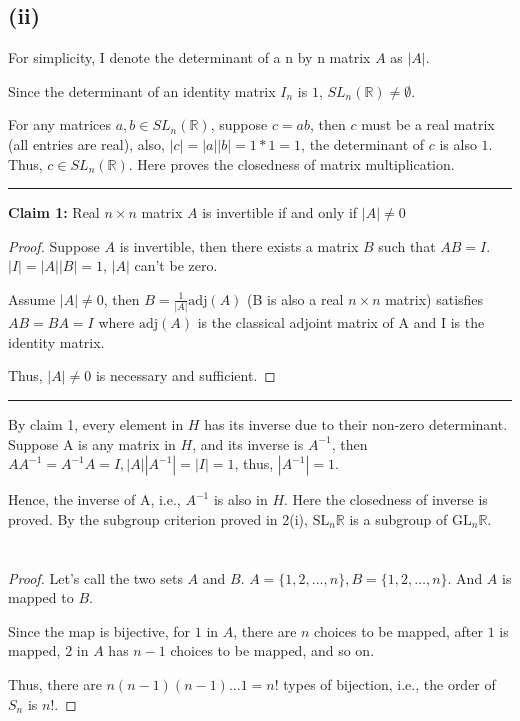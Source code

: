 \documentclass[12pt]{article}
\begin{document}
\subsection*{(ii)}
For simplicity, I denote the determinant of a n by n matrix $A$ as $|A|$.

Since the determinant of an identity matrix $I_n$ is $1$, $SL_n(\mathbb{R})\ne \emptyset$.

For any matrices $a,b\in SL_n(\mathbb{R})$, suppose $c=ab$, then $c$ must be a real matrix (all entries are real), also, $|c|=|a||b|=1*1=1$, the determinant of $c$ is also $1$. Thus, $c\in SL_n(\mathbb{R})$. Here proves the closedness of matrix multiplication.

\noindent\rule{\textwidth}{1pt}
\noindent \textbf{Claim 1: } Real $n\times n$ matrix $A$ is invertible if and only if $|A|\ne0$
\begin{proof}
Suppose $A$ is invertible, then there exists a matrix $B$ such that $AB=I$. $|I|=|A||B|=1$, $|A|$ can't be zero. 

Assume $|A|\ne 0$, then $B=\frac{1}{|A|}\mathrm{adj}(A)$ (B is also a real $n\times n$ matrix) satisfies $AB=BA=I$ where $\mathrm{adj}(A)$ is the classical adjoint matrix of A and I is the identity matrix.

Thus, $|A|\ne 0$ is necessary and sufficient.
\end{proof}
\noindent\rule{\textwidth}{1pt}

By claim 1, every element in $H$ has its inverse due to their non-zero determinant. Suppose A is any matrix in $H$, and its inverse is $A^{-1}$, then $AA^{-1}=A^{-1}A=I,|A||A^{-1}|=|I|=1$, thus, $|A^{-1}|=1$.

Hence, the inverse of A, i.e., $A^{-1}$ is also in $H$. Here the closedness of inverse is proved. By the subgroup criterion proved in 2(i), $\mathrm{SL}_n{\mathbb{R}}$ is a subgroup of $\mathrm{GL}_n{\mathbb{R}}$.


\newpage
\section{} %
\subsection{} %
\begin{proof}
Let's call the two sets $A$ and $B$. $A=\{1,2,\dots,n\},B=\{1,2,\dots,n\}$. And $A$ is mapped to $B$.

Since the map is bijective, for $1$ in $A$, there are $n$ choices to be mapped, after $1$ is mapped, $2$ in $A$ has $n-1$ choices to be mapped, and so on.

Thus, there are $n(n-1)(n-1)\dots1=n!$ types of bijection, i.e., the order of $S_n$ is $n!$.
\end{proof}
\end{document}
